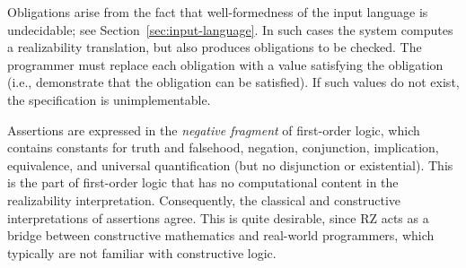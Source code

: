 Obligations arise from the fact that well-formedness 
of the input language is undecidable; see Section~\ref{sec:input-language}.  
In such cases the system computes a realizability translation, but also produces obligations 
to be checked.  The programmer must
replace each obligation with a value satisfying the
obligation (i.e., demonstrate that the obligation can be satisfied). 
If such values do not exist, the specification is
unimplementable.

\iffalse
Obligations serve a double role.
On one hand they are \emph{local assertions} that refer to local
values inside a term, e.g.,
%
\begin{equation*}
  \olambda{x}{\mathtt{real}}{(\oobligx{x^2-x+1 \neq 0}{x/(x^2-x+1)})}.
\end{equation*}
%
On the other hand they are \emph{local declarations} that require the
implementation of a local value inside a term, e.g.,
%
\begin{equation*}
  \olambda{x}{\mathtt{real}}{(
    \ooblig{y}{\mathtt{real}}{\phi(x,y)}{x+y}
    )},
\end{equation*}
%
requires that the programer define a local value~$y$ such
that$\phi(x,y)$ holds. In principle, local specifications could always
be expressed as global ones, but at a significant cost to clarity and
conciseness.

RZ outputs obligations when it encounters an uncheckable typing
constraint, or a term in the input whose well-formedness requires the
existence of a suitable term in the output, see
Section~\ref{sec:exampl-with-oblig}.
\fi
Assertions are expressed in the \emph{negative fragment} of
first-order logic, which contains constants for truth and falsehood,
negation, conjunction, implication, equivalence, and universal
quantification (but no disjunction or existential). This is the part
of first-order logic that has no computational content in the
realizability interpretation. Consequently, the classical and
constructive interpretations of assertions agree. This is quite
desirable, since RZ acts as a bridge between constructive mathematics
and real-world programmers, which typically are not familiar with
constructive logic. 
\iffalse
The basic predicates from which assertions are
built are observatinal equality $\oequal{\oe_1}{\oe_2}$, pers
$\oper{s}{\oe_1}{\oe_2}$ on abstract types, and basic predicates
declared as parameters. The formula $\ototal{\oe}{\os}$ stands for
$\oper{\os}{\oe}{\oe}$, while $\oforallt{\ox}{\os}{\op}$ is a
shorthand for
$\oforall{\ox}{\os}{(\oimply{\oper{\os}{\ox}{\ox}}{p})}$.
\fi

